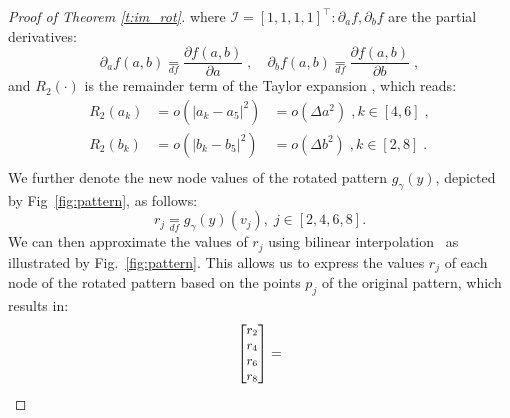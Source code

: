 \documentclass[10pt,journal,compsoc]{IEEEtran}
\newcommand{\df}{\mathop{=}\limits_{df}}
\begin{document}
\begin{proof}[Proof of Theorem \ref{t:im_rot}]
		\noindent
		where $\mathcal{I} = [1,1,1,1]^\intercal: \partial_a f, \partial_b f$ are the partial derivatives:
		\begin{equation}
		\partial_a f(a,b) \df \frac{\partial f(a, b)}{\partial a}\;, \quad \partial_b f(a,b) \df \frac{\partial f(a, b)}{\partial b} \;,
		\end{equation}
		and $R_2(\cdot)$ is the remainder term of the Taylor expansion%
		, which reads:
		\begin{equation}
		\begin{array}{rll}
		R_2(a_k) &= o(|a_k-a_5|^2) &= o(\Delta a^2) \;, k \in [4,6] \;, \\
		R_2(b_k) &= o(|b_k-b_5|^2) &= o(\Delta b^2) \;, k \in [2,8] \;.\\
		\end{array}
		\end{equation}
		\noindent
		We further denote the new node values of the rotated pattern $g_\gamma(y)$, depicted by Fig~\ref{fig:pattern}, as follows:
		\begin{equation}
		r_j \df g_\gamma(y)(v_j),\;  j \in [2,4,6,8].
		\label{eq:rj}
		\end{equation}
		\noindent
		We can then approximate the values of $r_j$ using bilinear interpolation~\cite{bb:Szeliski10} as illustrated by Fig.~\ref{fig:pattern}. This allows us to express the values $r_j$ of each node of the rotated pattern based on the points $p_j$ of the original pattern, which results in:
		\begin{equation}
		\small
		\begin{bmatrix}
		r_2 \\ r_4 \\ r_6 \\ r_8 \\
		\end{bmatrix} = 

\end{equation}
\end{proof}
\end{document}
